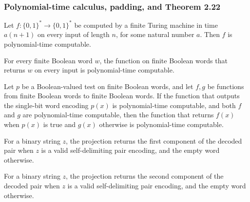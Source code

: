 \subsubsection{Polynomial-time calculus, padding, and Theorem 2.22}

\begin{lemma}
\label{Complexity.a3n_poly_linear}
\leanok
{}
Let $f : \{0,1\}^* \to \{0,1\}^*$ be computed by a finite Turing machine in time
$a(n+1)$ on every input of length $n$, for some natural number $a$. Then $f$ is
polynomial-time computable.
\end{lemma}

\begin{lemma}
\label{Complexity.a3n_poly_const}
\leanok
{}
For every finite Boolean word $w$, the function on finite Boolean words that returns $w$
on every input is polynomial-time computable.
\end{lemma}

\begin{lemma}
\label{Complexity.a3n_poly_cond}
\leanok
{}
Let $p$ be a Boolean-valued test on finite Boolean words, and let $f,g$ be functions
from finite Boolean words to finite Boolean words. If the function that outputs the
single-bit word encoding $p(x)$ is polynomial-time computable, and both $f$ and $g$ are
polynomial-time computable, then the function that returns $f(x)$ when $p(x)$ is true
and $g(x)$ otherwise is polynomial-time computable.
\end{lemma}

\begin{definition}
\label{Complexity.a3n_fst}
\leanok
{}
For a binary string $z$, the projection returns the first component of the decoded pair when $z$ is a valid self-delimiting pair encoding, and the empty word otherwise.
\end{definition}

\begin{definition}
\label{Complexity.a3n_snd}
\leanok
{}
For a binary string $z$, the projection returns the second component of the decoded pair when $z$ is a valid self-delimiting pair encoding, and the empty word otherwise.
\end{definition}


